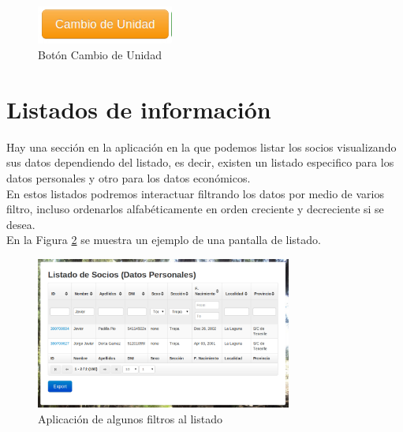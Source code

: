 \begin{figure}[H]
\begin{center}
\includegraphics[width=0.40\textwidth]{images/cambio_unidad.jpg}
\caption{Botón Cambio de Unidad}
\label{fig:cambio_unidad}
\end{center}
\end{figure}

\section{Listados de información}
\label{3:sec4}

Hay una sección en la aplicación en la que podemos listar los socios visualizando sus datos dependiendo del listado, es decir, existen un listado especifico para los datos personales y otro para los datos económicos.\\

En estos listados podremos interactuar filtrando los datos por medio de varios filtro, incluso ordenarlos alfabéticamente en orden creciente y decreciente si se desea.\\

En la Figura \ref{fig:listado} se muestra un ejemplo de una pantalla de listado.

\begin{figure}[H]
\begin{center}
\includegraphics[width=0.75\textwidth]{images/filtrado.jpg}
\caption{Aplicación de algunos filtros al listado}
\label{fig:listado}
\end{center}
\end{figure}


